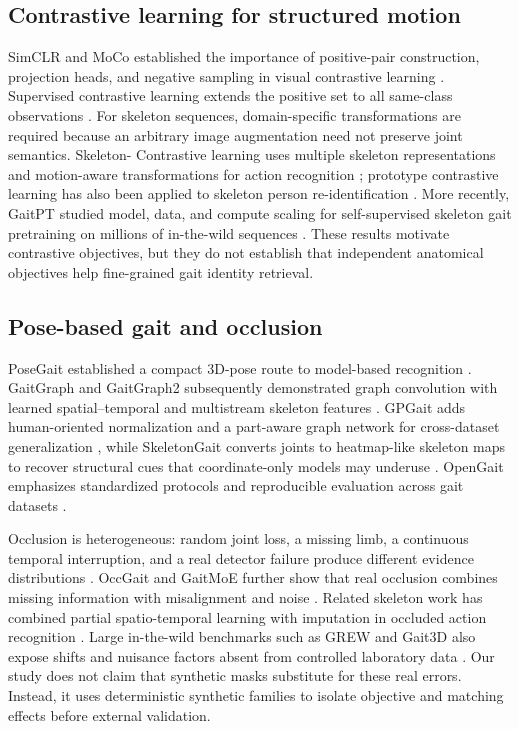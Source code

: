 \documentclass[runningheads]{llncs}
\begin{document}
\subsection{Contrastive learning for structured motion}

SimCLR and MoCo established the importance of positive-pair construction,
projection heads, and negative sampling in visual contrastive learning
\cite{chen2020simclr,he2020moco}. Supervised contrastive learning extends the
positive set to all same-class observations \cite{khosla2020supervised}. For
skeleton sequences, domain-specific transformations are required because an
arbitrary image augmentation need not preserve joint semantics. Skeleton-
Contrastive learning uses multiple skeleton representations and motion-aware
transformations for action recognition \cite{thoker2021skeleton}; prototype
contrastive learning has also been applied to skeleton person
re-identification \cite{rao2024skeleton}. More recently, GaitPT studied model,
data, and compute scaling for self-supervised skeleton gait pretraining on
millions of in-the-wild sequences \cite{cosma2026gaitpt}. These results motivate
contrastive objectives, but they do not establish that independent anatomical
objectives help fine-grained gait identity retrieval.

\subsection{Pose-based gait and occlusion}

PoseGait established a compact 3D-pose route to model-based recognition
\cite{liao2020posegait}. GaitGraph and GaitGraph2 subsequently demonstrated
graph convolution with learned spatial--temporal and multistream skeleton
features \cite{teepe2021gaitgraph,teepe2022gaitgraph2}. GPGait adds
human-oriented normalization and a part-aware graph network for cross-dataset
generalization \cite{fu2023gpgait}, while SkeletonGait converts joints to
heatmap-like skeleton maps to recover structural cues that coordinate-only
models may underuse \cite{fan2024skeletongait}. OpenGait emphasizes standardized
protocols and reproducible evaluation across gait datasets
\cite{fan2022opengait}.

Occlusion is heterogeneous: random joint loss, a missing limb, a continuous
temporal interruption, and a real detector failure produce different evidence
distributions \cite{li2024survey}. OccGait and GaitMoE further show that real
occlusion combines missing information with misalignment and noise
\cite{huang2024occluded}. Related skeleton work has combined partial
spatio-temporal learning with imputation in occluded action recognition
\cite{chen2023iopstl}. Large in-the-wild benchmarks such as GREW and Gait3D
also expose shifts and nuisance factors absent from controlled laboratory data
\cite{zhu2021grew,zheng2022gait3d}. Our study does not claim that synthetic
masks substitute for these real errors. Instead, it uses deterministic
synthetic families to isolate objective and matching effects before external
validation.
\end{document}
